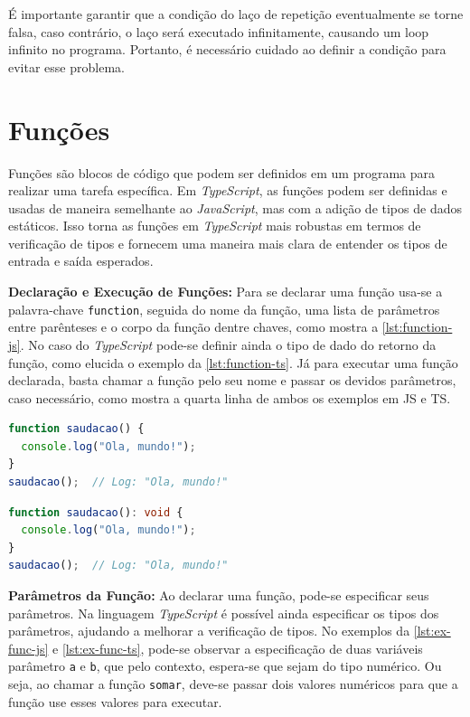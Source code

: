 É importante garantir que a condição do laço de repetição eventualmente se torne falsa, caso contrário, o laço será executado infinitamente, causando um loop infinito no programa. Portanto, é necessário cuidado ao definir a condição para evitar esse problema.





\section{Funções}
\label{JS_funcoes}

Funções são blocos de código que podem ser definidos em um programa para realizar uma tarefa específica. Em \textit{TypeScript}, as funções podem ser definidas e usadas de maneira semelhante ao \textit{JavaScript}, mas com a adição de tipos de dados estáticos. Isso torna as funções em \textit{TypeScript} mais robustas em termos de verificação de tipos e fornecem uma maneira mais clara de entender os tipos de entrada e saída esperados.

\textbf{Declaração e Execução de Funções:} Para se declarar uma função usa-se a palavra-chave \texttt{function}, seguida do nome da função, uma lista de parâmetros entre parênteses e o corpo da função dentre chaves, como mostra a \autoref{lst:function-js}. No caso do \textit{TypeScript} pode-se definir ainda o tipo de dado do retorno da função, como elucida o exemplo da \autoref{lst:function-ts}. Já para executar uma função declarada, basta chamar a função pelo seu nome e passar os devidos parâmetros, caso necessário, como mostra a quarta linha de ambos os exemplos em JS e TS.

\begin{lstlisting}[language=TypeScript, caption=Exemplo de Declaração de Função em JS., label=lst:function-js]
function saudacao() {
  console.log("Ola, mundo!");
}
saudacao();  // Log: "Ola, mundo!"
\end{lstlisting}

\begin{lstlisting}[language=TypeScript, caption=Exemplo de Declaração de Função em TS., label=lst:function-ts]
function saudacao(): void {
  console.log("Ola, mundo!");
}
saudacao();  // Log: "Ola, mundo!"
\end{lstlisting}



\textbf{Parâmetros da Função:} Ao declarar uma função, pode-se especificar seus parâmetros. Na linguagem \textit{TypeScript} é possível ainda especificar os tipos dos parâmetros, ajudando a melhorar a verificação de tipos. No exemplos da \autoref{lst:ex-func-js} e \autoref{lst:ex-func-ts}, pode-se observar a especificação de duas variáveis parâmetro \texttt{a} e \texttt{b}, que pelo contexto, espera-se que sejam do tipo numérico. Ou seja, ao chamar a função \texttt{somar}, deve-se passar dois valores numéricos para que a função use esses valores para executar.

